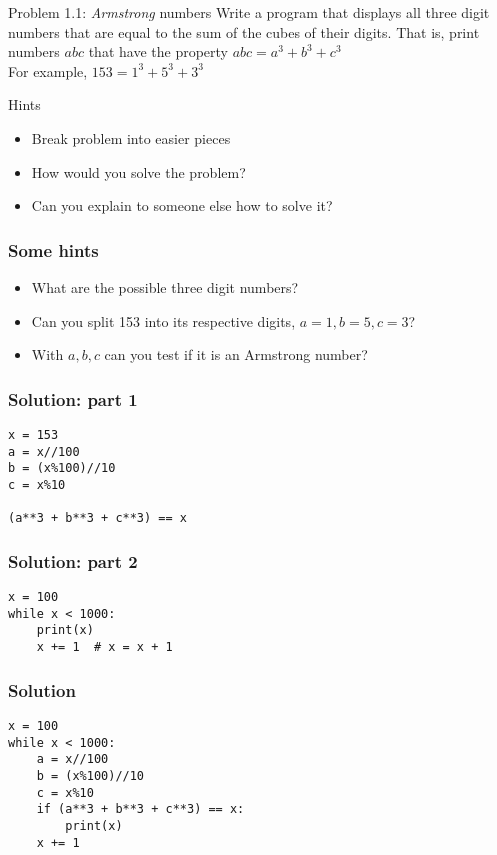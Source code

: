 \documentclass[14pt,compress]{beamer}
\begin{document}
\begin{frame}{Problem 1.1: \emph{Armstrong} numbers}
  Write a program that displays all three digit numbers that are equal to the sum of the cubes of their digits. That is, print numbers $abc$ that have the property $abc = a^3 + b^3 + c^3$\\
For example, $153 = 1^3 + 5^3 + 3^3$\\
\vspace*{0.2in}

\begin{block}{Hints}
  \begin{itemize}
  \item Break problem into easier pieces
  \item How would you solve the problem?
  \item Can you explain to someone else how to solve it?
  \end{itemize}
\end{block}
\end{frame}

\begin{frame}[fragile]
  \frametitle{Some hints}
  \begin{itemize}
  \item What are the possible three digit numbers?
  \item Can you split 153 into its respective digits, $a=1, b=5, c=3$?
  \item With $a, b, c$ can you test if it is an Armstrong number?
  \end{itemize}
\end{frame}

\begin{frame}[fragile]
  \frametitle{Solution: part 1}
\begin{lstlisting}
x = 153
a = x//100
b = (x%100)//10
c = x%10

(a**3 + b**3 + c**3) == x
\end{lstlisting}
\end{frame}

\begin{frame}[fragile]
  \frametitle{Solution: part 2}
\begin{lstlisting}
x = 100
while x < 1000:
    print(x)
    x += 1  # x = x + 1
\end{lstlisting}
\end{frame}

\begin{frame}[fragile]
  \frametitle{Solution}
\begin{lstlisting}
x = 100
while x < 1000:
    a = x//100
    b = (x%100)//10
    c = x%10
    if (a**3 + b**3 + c**3) == x:
        print(x)
    x += 1
\end{lstlisting}
\end{frame}
\end{document}
